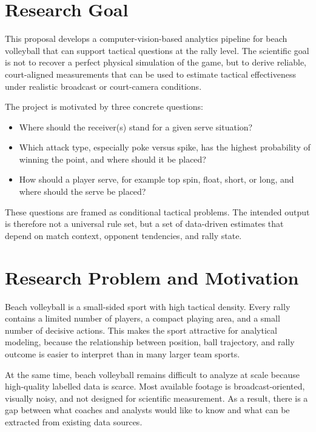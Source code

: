 \documentclass[a4paper]{article}
\title{\docTitle}
\author{Moritz}
\date{\today}
\begin{document}
\maketitle
\tableofcontents

\section{Research Goal}
This proposal develops a computer-vision-based analytics pipeline for beach volleyball that can support tactical questions at the rally level. The scientific goal is not to recover a perfect physical simulation of the game, but to derive reliable, court-aligned measurements that can be used to estimate tactical effectiveness under realistic broadcast or court-camera conditions.

The project is motivated by three concrete questions:
\begin{itemize}
	\item Where should the receiver(s) stand for a given serve situation?
	\item Which attack type, especially poke versus spike, has the highest probability of winning the point, and where should it be placed?
	\item How should a player serve, for example top spin, float, short, or long, and where should the serve be placed?
\end{itemize}

These questions are framed as conditional tactical problems. The intended output is therefore not a universal rule set, but a set of data-driven estimates that depend on match context, opponent tendencies, and rally state.

\section{Research Problem and Motivation}
Beach volleyball is a small-sided sport with high tactical density. Every rally contains a limited number of players, a compact playing area, and a small number of decisive actions. This makes the sport attractive for analytical modeling, because the relationship between position, ball trajectory, and rally outcome is easier to interpret than in many larger team sports.

At the same time, beach volleyball remains difficult to analyze at scale because high-quality labelled data is scarce. Most available footage is broadcast-oriented, visually noisy, and not designed for scientific measurement. As a result, there is a gap between what coaches and analysts would like to know and what can be extracted from existing data sources.
\end{document}
